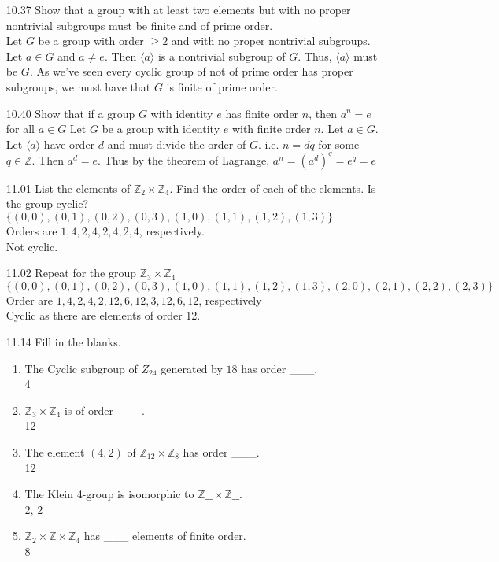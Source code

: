 \documentclass[12pt]{article}
\newcommand{\Z}{\mathds{Z}}
\begin{document}
\begin{enumerate}
	 \item[10.37] Show that a group with at least two elements but with no proper nontrivial subgroups must be finite and of prime order. \\
	 Let $ G $ be a group with order $ \geq 2 $ and with no proper nontrivial subgroups. Let $ a \in G $ and $ a \not = e $. Then $ \langle a \rangle $ is a nontrivial subgroup of $ G $. Thus, $ \langle a \rangle $ must be $ G $. As we've seen every cyclic group of not of prime order has proper subgroups, we must have that $ G $ is finite of prime order.
	 
	 \item[10.40] Show that if a group $ G $ with identity $ e $ has finite order $ n $, then $ a^n =e $ for all $ a\in G $
	 Let $ G $ be a group with identity $ e $ with finite order $ n $. Let $ a \in G $. Let $ \langle a \rangle $ have order $ d $ and must divide the order of $ G $. i.e. $ n=dq $ for some $ q\in \Z $. Then $ a^d = e $. Thus by the theorem of Lagrange, $ a^n = (a^d)^q=e^q=e $
	 
	 \item[11.01] List the elements of $ \Z_2 \times \Z_4 $. Find the order of each of the elements. Is the group cyclic?
	 	$ \{(0,0),(0,1),(0,2),(0,3),(1,0),(1,1),(1,2),(1,3)\} $\\
	 	Orders are $ 1,4,2,4,2,4,2,4 $, respectively.\\
	 	Not cyclic.
	 \item[11.02] Repeat for the group $ \Z_3 \times \Z_4  $
	   $ \{ (0,0),(0,1),(0,2),(0,3),(1,0),(1,1),(1,2),(1,3),(2,0),(2,1),(2,2),(2,3)\}$\\
	   Order are $ 1,4,2,4,2,12,6,12,3,12,6,12 $, respectively\\
	   Cyclic as there are elements of order 12.
	 \item[11.14] Fill in the blanks.
	 	\begin{enumerate}
			\item The Cyclic subgroup of $ Z_{24} $ generated by $ 18 $ has order \_\_\_.\\
			4	 
			\item $ \Z_3 \times \Z_4 $ is of order \_\_\_.\\
			12
			\item The element $ (4,2) $ of $ \Z_{12} \times \Z_8 $ has order \_\_\_.\\
			12
			\item The Klein 4-group is isomorphic to $ \Z \_\_ \times \Z\_\_ $.\\
			2, 2
			\item $ \Z_2 \times \Z \times \Z_4 $ has \_\_\_ elements of finite order.\\
			8
     	\end{enumerate}
	 

\end{enumerate}
\end{document}
